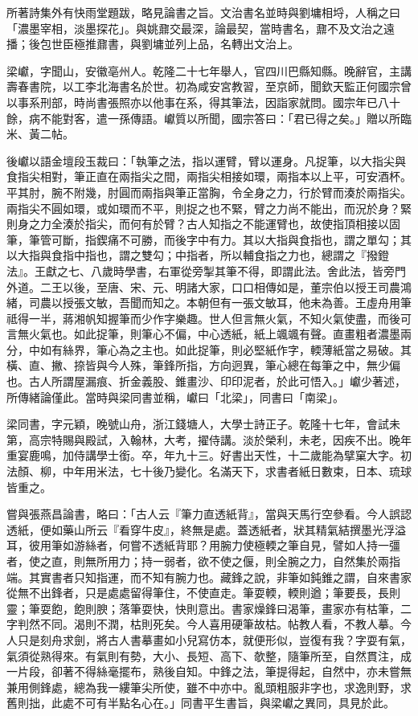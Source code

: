 \begin{pinyinscope}
所著詩集外有快雨堂題跋，略見論書之旨。文治書名並時與劉墉相埒，人稱之曰「濃墨宰相，淡墨探花」。與姚鼐交最深，論最契，當時書名，鼐不及文治之遠播；後包世臣極推鼐書，與劉墉並列上品，名轉出文治上。

梁巘，字聞山，安徽亳州人。乾隆二十七年舉人，官四川巴縣知縣。晚辭官，主講壽春書院，以工李北海書名於世。初為咸安宮教習，至京師，聞欽天監正何國宗曾以事系刑部，時尚書張照亦以他事在系，得其筆法，因詣家就問。國宗年已八十餘，病不能對客，遣一孫傳語。巘質以所聞，國宗答曰：「君已得之矣。」贈以所臨米、黃二帖。

後巘以語金壇段玉裁曰：「執筆之法，指以運臂，臂以運身。凡捉筆，以大指尖與食指尖相對，筆正直在兩指尖之間，兩指尖相接如環，兩指本以上平，可安酒杯。平其肘，腕不附幾，肘圓而兩指與筆正當胸，令全身之力，行於臂而湊於兩指尖。兩指尖不圓如環，或如環而不平，則捉之也不緊，臂之力尚不能出，而況於身？緊則身之力全湊於指尖，而何有於臂？古人知指之不能運臂也，故使指頂相接以固筆，筆管可斷，指鍥痛不可勝，而後字中有力。其以大指與食指也，謂之單勾；其以大指與食指中指也，謂之雙勾；中指者，所以輔食指之力也，總謂之『撥鐙法』。王獻之七、八歲時學書，右軍從旁掣其筆不得，即謂此法。舍此法，皆旁門外道。二王以後，至唐、宋、元、明諸大家，口口相傳如是，董宗伯以授王司農鴻緒，司農以授張文敏，吾聞而知之。本朝但有一張文敏耳，他未為善。王虛舟用筆祗得一半，蔣湘帆知握筆而少作字樂趣。世人但言無火氣，不知火氣使盡，而後可言無火氣也。如此捉筆，則筆心不偏，中心透紙，紙上颯颯有聲。直畫粗者濃墨兩分，中如有絲界，筆心為之主也。如此捉筆，則必堅紙作字，輭薄紙當之易破。其橫、直、撇、捺皆與今人殊，筆鋒所指，方向迥異，筆心總在每筆之中，無少偏也。古人所謂屋漏痕、折金義股、錐畫沙、印印泥者，於此可悟入。」巘少著述，所傳緒論僅此。當時與梁同書並稱，巘曰「北梁」，同書曰「南梁」。

梁同書，字元穎，晚號山舟，浙江錢塘人，大學士詩正子。乾隆十七年，會試未第，高宗特賜與殿試，入翰林，大考，擢侍講。淡於榮利，未老，因疾不出。晚年重宴鹿鳴，加侍講學士銜。卒，年九十三。好書出天性，十二歲能為擘窠大字。初法顏、柳，中年用米法，七十後乃變化。名滿天下，求書者紙日數束，日本、琉球皆重之。

嘗與張燕昌論書，略曰：「古人云『筆力直透紙背』，當與天馬行空參看。今人誤認透紙，便如藥山所云『看穿牛皮』，終無是處。蓋透紙者，狀其精氣結撰墨光浮溢耳，彼用筆如游絲者，何嘗不透紙背耶？用腕力使極輭之筆自見，譬如人持一彊者，使之直，則無所用力；持一弱者，欲不使之偃，則全腕之力，自然集於兩指端。其實書者只知指運，而不知有腕力也。藏鋒之說，非筆如鈍錐之謂，自來書家從無不出鋒者，只是處處留得筆住，不使直走。筆耍輭，輭則遒；筆要長，長則靈；筆耍飽，飽則腴；落筆耍快，快則意出。書家燥鋒曰渴筆，畫家亦有枯筆，二字判然不同。渴則不潤，枯則死矣。今人喜用硬筆故枯。帖教人看，不教人摹。今人只是刻舟求劍，將古人書摹畫如小兒寫仿本，就便形似，豈復有我？字耍有氣，氣須從熟得來。有氣則有勢，大小、長短、高下、欹整，隨筆所至，自然貫注，成一片段，卻著不得絲毫擺布，熟後自知。中鋒之法，筆提得起，自然中，亦未嘗無兼用側鋒處，總為我一縷筆尖所使，雖不中亦中。亂頭粗服非字也，求逸則野，求舊則拙，此處不可有半點名心在。」同書平生書旨，與梁巘之異同，具見於此。


\end{pinyinscope}

